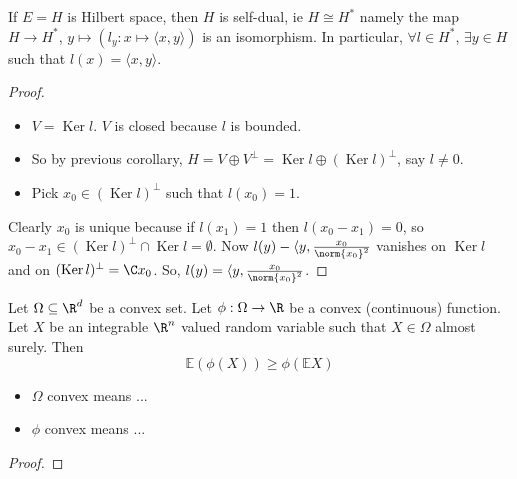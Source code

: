 \documentclass{article}
\newcommand{\1}[1]{\mathbbm{1}_{#1}}
\newcommand{\E}{\mathbb{E}}
\DeclareMathOperator{\Ker}{Ker}
\begin{document}
\begin{prop}
    If $E = H$ is Hilbert space, then $H$ is self-dual, ie $H \cong H^*$ namely the map $H \to H^*$, $y \mapsto (l_y: x \mapsto \langle x, y \rangle)$ is an isomorphism.
    In particular, $\forall l \in H^*$, $\exists y \in H$ such that $l(x) = \langle x, y \rangle$.
\end{prop}

\begin{proof}
    \leavevmode
    \begin{itemize}
        \item $V = \Ker l$. $V$ is closed because $l$ is bounded.
        \item So by previous corollary, $H = V \oplus V^\bot = \Ker l \oplus (\Ker l)^\bot$, say $l \neq 0$.
        \item Pick $x_0 \in (\Ker l)^\bot$ such that $l(x_0) = 1$.
    \end{itemize}
    Clearly $x_0$ is unique because if $l(x_1) = 1$ then $l(x_0 - x_1) = 0$, so $x_0 - x_1 \in (\Ker l)^\bot \cap \Ker l = \emptyset$.
    Now $l(y) - \langle y, \frac{x_0}{\norm{x_0}^2}$ vanishes on $\Ker l$ and on $(\Ker l)^\bot = \C x_0$. %
    So, $l(y) = \langle y, \frac{x_0}{\norm{x_0}^2}$.
\end{proof}

\begin{thm}
    Let $\Omega \subseteq \R^d$ be a convex set.
    Let $\phi: \Omega \to \R$ be a convex (continuous) function.
    Let $X$ be an integrable $\R^n$ valued random variable such that $X \in \Omega$ almost surely.
    Then
    \begin{equation*}
        \E(\phi(X)) \geq \phi(\E X)
    \end{equation*}
\end{thm}

\begin{remark}
    \leavevmode
    \begin{itemize}
        \item $\Omega$ convex means ...
        \item $\phi$ convex means ...
    \end{itemize}
\end{remark}

\begin{proof}

\end{proof}
\end{document}
